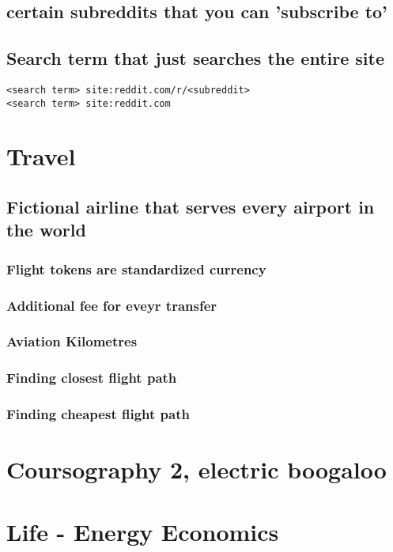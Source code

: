 \documentclass[11pt]{article}
\begin{document}
\subsection{certain subreddits that you can 'subscribe to'}
\label{sec:org570366f}
\subsection{Search term that just searches the entire site}
\label{sec:org955ebcf}
\begin{verbatim}
<search term> site:reddit.com/r/<subreddit>
<search term> site:reddit.com
\end{verbatim}
\section{Travel}
\label{sec:org4235cc2}
\subsection{Fictional airline that serves every airport in the world}
\label{sec:org0ec421a}
\subsubsection{Flight tokens are standardized currency}
\label{sec:orgddb7451}
\subsubsection{Additional fee for eveyr transfer}
\label{sec:orgdc67f2d}
\subsubsection{Aviation Kilometres}
\label{sec:org97acd63}
\subsubsection{Finding closest flight path}
\label{sec:org08d3846}
\subsubsection{Finding cheapest flight path}
\label{sec:org2d56bd7}
\section{Coursography 2, electric boogaloo}
\label{sec:orged861ed}
\section{Life - Energy Economics}
\label{sec:orgf6ffe07}
\end{document}
